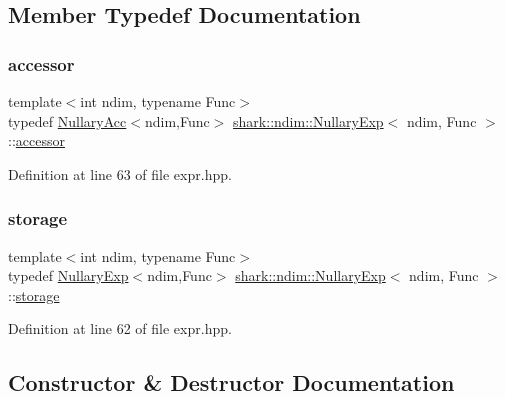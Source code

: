 \subsection{Member Typedef Documentation}
\hypertarget{classshark_1_1ndim_1_1_nullary_exp_a3934c7a6d447182edb34537703afed68}{}\label{classshark_1_1ndim_1_1_nullary_exp_a3934c7a6d447182edb34537703afed68} 
\subsubsection{\texorpdfstring{accessor}{accessor}}
{\footnotesize\ttfamily template$<$int ndim, typename Func$>$ \\
typedef \hyperlink{classshark_1_1ndim_1_1_nullary_acc}{Nullary\+Acc}$<$ndim,Func$>$ \hyperlink{classshark_1_1ndim_1_1_nullary_exp}{shark\+::ndim\+::\+Nullary\+Exp}$<$ ndim, Func $>$\+::\hyperlink{classshark_1_1ndim_1_1_nullary_exp_a3934c7a6d447182edb34537703afed68}{accessor}}



Definition at line 63 of file expr.\+hpp.

\hypertarget{classshark_1_1ndim_1_1_nullary_exp_aaa0a351df054b29eef3d783eb6914ec8}{}\label{classshark_1_1ndim_1_1_nullary_exp_aaa0a351df054b29eef3d783eb6914ec8} 
\subsubsection{\texorpdfstring{storage}{storage}}
{\footnotesize\ttfamily template$<$int ndim, typename Func$>$ \\
typedef \hyperlink{classshark_1_1ndim_1_1_nullary_exp}{Nullary\+Exp}$<$ndim,Func$>$ \hyperlink{classshark_1_1ndim_1_1_nullary_exp}{shark\+::ndim\+::\+Nullary\+Exp}$<$ ndim, Func $>$\+::\hyperlink{classshark_1_1ndim_1_1_nullary_exp_aaa0a351df054b29eef3d783eb6914ec8}{storage}}



Definition at line 62 of file expr.\+hpp.



\subsection{Constructor \& Destructor Documentation}
\hypertarget{classshark_1_1ndim_1_1_nullary_exp_a8de00bdc6aab3dd30183ac0b79055bbf}{}\label{classshark_1_1ndim_1_1_nullary_exp_a8de00bdc6aab3dd30183ac0b79055bbf} 
